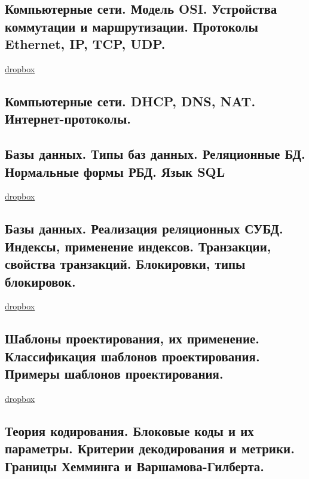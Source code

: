 \documentclass{article}
\begin{document}
\subsection{Компьютерные сети. Модель OSI. Устройства коммутации и маршрутизации. Протоколы Ethernet, IP, TCP, UDP.}

\href{https://www.dropbox.com/sh/4st5b16mvdf8gkj/AAAI9sbKs_C3TFgRbqWGrAeca/Programming/16%20%D0%9A%D0%BE%D0%BC%D0%BF%D1%8C%D1%8E%D1%82%D0%B5%D1%80%D0%BD%D1%8B%D0%B5%20%D1%81%D0%B5%D1%82%D0%B8.pdf?dl=0}{dropbox}

\subsection{Компьютерные сети. DHCP, DNS, NAT. Интернет-протоколы.}

\subsection{Базы данных. Типы баз данных. Реляционные БД. Нормальные формы РБД. Язык SQL}

\href{https://www.dropbox.com/sh/4st5b16mvdf8gkj/AACJWcRNv0lFmPzhlkMSxN7Va/Programming/12%20%D0%91%D0%B0%D0%B7%D1%8B%20%D0%B4%D0%B0%D0%BD%D0%BD%D1%8B%D1%85.pdf?dl=0}{dropbox}

\subsection{Базы данных. Реализация реляционных СУБД. Индексы, применение индексов. Транзакции, свойства транзакций. Блокировки, типы блокировок.}

\href{https://www.dropbox.com/sh/4st5b16mvdf8gkj/AADo-NrUSL5vJLWDfeAFWwy1a/Programming/13%20%D0%A0%D0%B5%D0%BB%D1%8F%D1%86%D0%B8%D0%BE%D0%BD%D0%BD%D1%8B%D0%B5%20%D0%A1%D0%A3%D0%91%D0%94.pdf?dl=0}{dropbox}

\subsection{Шаблоны проектирования, их применение. Классификация шаблонов проектирования. Примеры шаблонов проектирования.}

\href{https://www.dropbox.com/sh/4st5b16mvdf8gkj/AACWB4gDVx73cjp5xudo1nGma/Programming/18%20%D0%A8%D0%B0%D0%B1%D0%BB%D0%BE%D0%BD%D1%8B%20%D0%BF%D1%80%D0%BE%D0%B5%D0%BA%D1%82%D0%B8%D1%80%D0%BE%D0%B2%D0%B0%D0%BD%D0%B8%D1%8F.pdf?dl=0}{dropbox}

\subsection{Теория кодирования. Блоковые коды и их параметры. Критерии декодирования и метрики. Границы Хемминга и Варшамова-Гилберта.}
\end{document}
